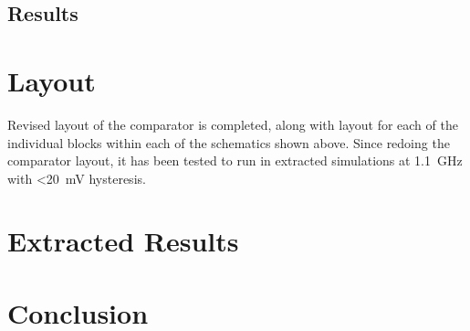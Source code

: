 \documentclass[11pt,letterpaper]{article}
\begin{document}
\subsection{Results}


\section{Layout}

Revised layout of the comparator is completed, along with layout for each of the individual blocks within each of the schematics shown above. Since redoing the comparator layout, it has been tested to run in extracted simulations at \qty{1.1}{\GHz} with <\qty{20}{\mV} hysteresis.

\section{Extracted Results}


\section{Conclusion}


\newpage



\end{document}
